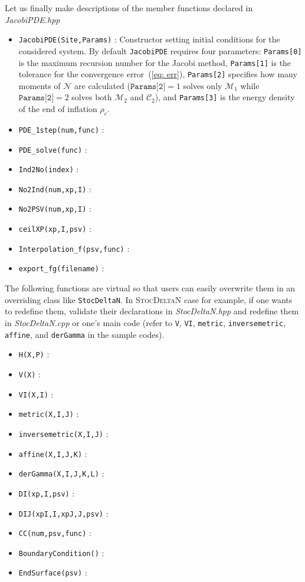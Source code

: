 \documentclass[aps, prd
, preprint
, nofootinbib 
, notitlepage
, superscriptaddress
, longbibliography
]{revtex4-1}
\newcommand{\calC}{\mathcal{C}}
\newcommand{\calM}{\mathcal{M}}
\newcommand{\calN}{\mathcal{N}}
\begin{document}
Let us finally make descriptions of the member functions declared in \textit{JacobiPDE.hpp}
\begin{itemize}
    \item \texttt{JacobiPDE(Site,Params)} : 
    Constructor setting initial conditions for the considered system. By default \texttt{JacobiPDE} requires four parameters: \texttt{Params[0]} is the maximum recursion number for the Jacobi method, \texttt{Params[1]} is the tolerance for the convergence error~(\ref{eq: err}), \texttt{Params[2]} specifies how many moments of $\calN$ are calculated ($\texttt{Params[2]}=1$ solves only $\calM_1$ while $\texttt{Params[2]}=2$ solves both $\calM_2$ and $\calC_2$), and \texttt{Params[3]} is the energy density of the end of inflation $\rho_c$.
    \item \texttt{PDE\_1step(num,func)} : 
    \item \texttt{PDE\_solve(func)} : 
    \item \texttt{Ind2No(index)} : 
    \item \texttt{No2Ind(num,xp,I)} : 
    \item \texttt{No2PSV(num,xp,I)} : 
    \item \texttt{ceilXP(xp,I,psv)} : 
    \item \texttt{Interpolation\_f(psv,func)} : 
    \item \texttt{export\_fg(filename)} : 
\end{itemize}
The following functions are virtual so that users can easily overwrite them in an overriding class like \texttt{StocDeltaN}.
In \textsc{StocDeltaN} case for example, if one wants to redefine them, validate their declarations in \textit{StocDeltaN.hpp} and redefine them in \textit{StocDeltaN.cpp} or one's main code (refer to \texttt{V}, \texttt{VI}, \texttt{metric}, \texttt{inversemetric}, \texttt{affine}, and \texttt{derGamma} in the sample codes).
\begin{itemize}
    \item \texttt{H(X,P)} : 
    \item \texttt{V(X)} : 
    \item \texttt{VI(X,I)} : 
    \item \texttt{metric(X,I,J)} : 
    \item \texttt{inversemetric(X,I,J)} : 
    \item \texttt{affine(X,I,J,K)} : 
    \item \texttt{derGamma(X,I,J,K,L)} : 
    \item \texttt{DI(xp,I,psv)} : 
    \item \texttt{DIJ(xpI,I,xpJ,J,psv)} : 
    \item \texttt{CC(num,psv,func)} : 
    \item \texttt{BoundaryCondition()} : 
    \item \texttt{EndSurface(psv)} : 
\end{itemize}
\end{document}
